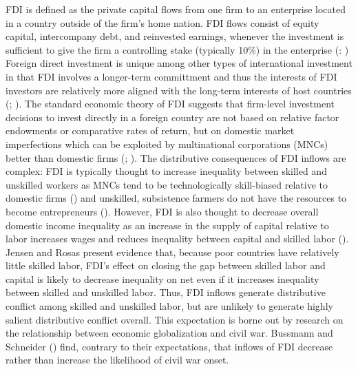 \documentclass[12pt]{report}
\begin{document}
FDI is defined as the private capital flows from one firm to an enterprise
located in a country outside of the firm's home nation. FDI flows
consist of equity capital, intercompany debt, and reinvested earnings,
whenever the investment is sufficient to give the firm a controlling
stake (typically 10\%) in the enterprise (\citealt[9]{DirectInvestmentTechnicalExpertGroupDITEG:2004wa}:
\citealt[588]{Jensen:2003to}) Foreign direct investment is unique
among other types of international investment in that FDI involves
a longer-term committment and thus the interests of FDI investors
are relatively more aligned with the long-term interests of host countries
(\citealt{Lipsey:1999tn}; \citealt[588]{Jensen:2003to}). The standard
economic theory of FDI suggests that firm-level investment decisions
to invest directly in a foreign country are not based on relative
factor endowments or comparative rates of return, but on domestic
market imperfections which can be exploited by multinational corporations
(MNCs) better than domestic firms (\citealt{Hymer:1960vo}; \citealt{dunning2013international}).
The distributive consequences of FDI inflows are complex: FDI is typically
thought to increase inequality between skilled and unskilled workers
as MNCs tend to be technologically skill-biased relative to domestic
firms (\citealt{Feenstra:1997kx}) and unskilled, subsistence farmers
do not have the resources to become entrepreneurs (\citealt{Basu:2007ir}).
However, FDI is also thought to decrease overall domestic income inequality
as an increase in the supply of capital relative to labor increases
wages and reduces inequality between capital and skilled labor (\citealt{Jensen:2007fr}).
Jensen and Rosas present evidence that, because poor countries have
relatively little skilled labor, FDI's effect on closing the gap between
skilled labor and capital is likely to decrease inequality on net
even if it increases inequality between skilled and unskilled labor.
Thus, FDI inflows generate distributive conflict among skilled and
unskilled labor, but are unlikely to generate highly salient distributive
conflict overall. This expectation is borne out by research on the
relationship between economic globalization and civil war. Bussmann
and Schneider (\citeyear{Bussmann:2007vx}) find, contrary to their
expectations, that inflows of FDI decrease rather than increase the
likelihood of civil war onset.
\end{document}

